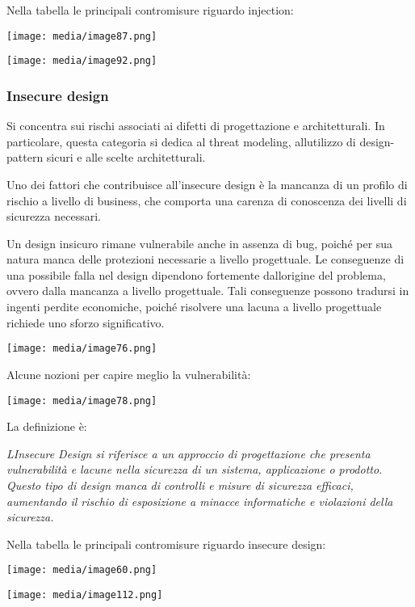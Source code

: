 Nella tabella le principali contromisure riguardo injection:

\texttt{[image: media/image87.png]}

\texttt{[image: media/image92.png]}

\subsubsection{Insecure design}\label{insecure-design}

Si concentra sui rischi associati ai difetti di progettazione e
architetturali. In particolare, questa categoria si dedica al threat
modeling, all\textquotesingle utilizzo di design-pattern sicuri e alle
scelte architetturali.

Uno dei fattori che contribuisce all'insecure design è la mancanza di un
profilo di rischio a livello di business, che comporta una carenza di
conoscenza dei livelli di sicurezza necessari.

Un design insicuro rimane vulnerabile anche in assenza di bug, poiché
per sua natura manca delle protezioni necessarie a livello progettuale.
Le conseguenze di una possibile falla nel design dipendono fortemente
dall\textquotesingle origine del problema, ovvero dalla mancanza a
livello progettuale. Tali conseguenze possono tradursi in ingenti
perdite economiche, poiché risolvere una lacuna a livello progettuale
richiede uno sforzo significativo.

\texttt{[image: media/image76.png]}

Alcune nozioni per capire meglio la vulnerabilità:

\texttt{[image: media/image78.png]}

La definizione è:

\emph{L\textquotesingle Insecure Design si riferisce a un approccio di
progettazione che presenta vulnerabilità e lacune nella sicurezza di un
sistema, applicazione o prodotto. Questo tipo di design manca di
controlli e misure di sicurezza efficaci, aumentando il rischio di
esposizione a minacce informatiche e violazioni della sicurezza.}

Nella tabella le principali contromisure riguardo insecure design:

\texttt{[image: media/image60.png]}

\texttt{[image: media/image112.png]}

